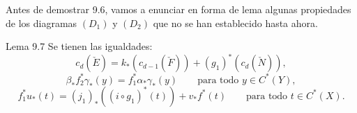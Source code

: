Antes de demostrar 9.6, vamos a enunciar en forma de lema algunas propiedades de los diagramas $(D_1)$ y $(D_2)$ que no se han establecido hasta ahora.

\begin{statement}{Lema 9.7}
Se tienen las igualdades:
\[
c_d(\check E)=k_*(c_{d-1}(\check F))+(g_1)^*(c_d(\check N)),
\tag{9.7 i}
\]
\[
\beta_*f_2^*\gamma_*(y)=f_1^*\alpha_*\gamma_*(y)\qquad\text{para todo }y\in C^*(Y),
\tag{9.7 ii}
\]
\[
f_1^*u_*(t)=(j_1)_*((i\circ g_1)^*(t))+v_*f^*(t)\qquad\text{para todo }t\in C^*(X).
\tag{9.7 iii}
\]
\end{statement}
